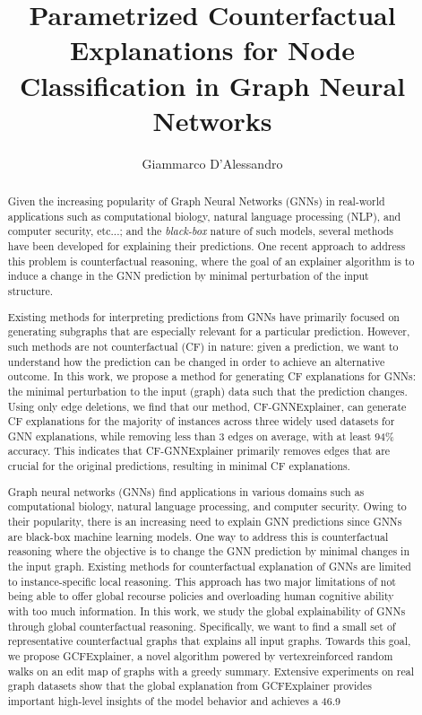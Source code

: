 \documentclass[binding=0.6cm,LaM]{sapthesis}
\title{Parametrized Counterfactual Explanations for Node Classification in Graph Neural Networks}
\author{Giammarco D'Alessandro}
\begin{document}
\frontmatter
\maketitle
\dedication{Dedicato a\\ Donald Knuth}

\begin{abstract}
Given the increasing popularity of Graph Neural Networks (GNNs) in real-world applications such as computational biology, natural language processing (NLP), and computer security, etc...; and the \textit{black-box} nature of such models, several methods have been developed for explaining their predictions. One recent approach to address this problem is counterfactual reasoning, where the goal of an explainer algorithm is to induce a change in the GNN prediction by minimal perturbation of the input structure. 

Existing methods for interpreting predictions from GNNs have primarily focused on generating subgraphs that are especially relevant for a particular prediction. However, such methods are not counterfactual (CF) in nature: given a prediction, we want to understand how the prediction can be changed in order to achieve an alternative outcome. In this work, we propose a method for generating CF explanations for GNNs: the minimal perturbation to the input (graph) data such that the prediction changes. Using only edge deletions, we find that our method, CF-GNNExplainer, can generate CF explanations for the majority of instances across three widely used datasets for GNN explanations, while removing less than 3 edges on average, with at least 94\% accuracy. This indicates that CF-GNNExplainer primarily removes edges that are crucial for the original predictions, resulting in minimal CF explanations.

Graph neural networks (GNNs) find applications in various domains such as computational biology, natural language processing, and computer security. Owing to their popularity, there is an increasing need to explain GNN predictions since GNNs are black-box machine learning models. One way to address this is counterfactual reasoning where the objective is to change the GNN prediction by minimal changes in the input graph. Existing methods for counterfactual explanation of GNNs are limited to instance-specific local reasoning. This approach has two major limitations of not being able to offer global recourse policies and overloading human cognitive ability with too much information. In this work, we study the global explainability of GNNs through global counterfactual reasoning. Specifically, we want to find a small set of representative counterfactual graphs that explains all input graphs. Towards this goal, we propose GCFExplainer, a novel algorithm powered by vertexreinforced random walks on an edit map of graphs with a greedy summary. Extensive experiments on real graph datasets show that the global explanation from GCFExplainer provides important high-level insights of the model behavior and achieves a 46.9%
\end{abstract}
\end{document}
